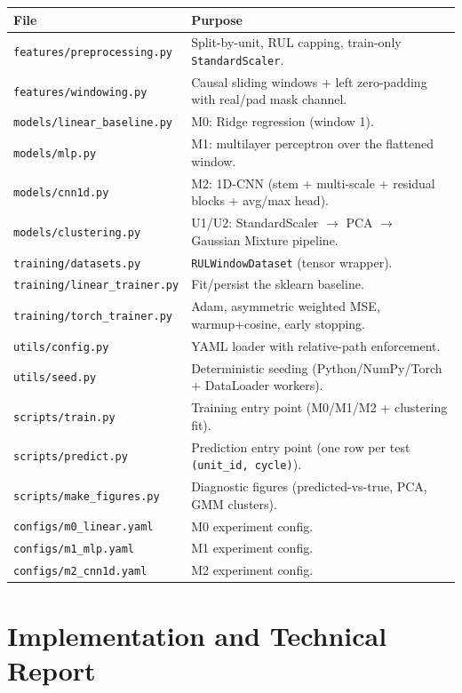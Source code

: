 \documentclass[11pt,a4paper]{article}
\newcommand{\code}[1]{\texttt{\small #1}}
\begin{document}
\begin{longtable}{p{6.5cm} p{8.5cm}}
\toprule
File & Purpose\\
\midrule
\endhead
\code{features/preprocessing.py} & Split-by-unit, RUL capping, train-only \code{StandardScaler}.\\
\code{features/windowing.py} & Causal sliding windows + left zero-padding with real/pad mask channel.\\
\code{models/linear\_baseline.py} & M0: Ridge regression (window 1).\\
\code{models/mlp.py} & M1: multilayer perceptron over the flattened window.\\
\code{models/cnn1d.py} & M2: 1D-CNN (stem + multi-scale + residual blocks + avg/max head).\\
\code{models/clustering.py} & U1/U2: StandardScaler $\to$ PCA $\to$ Gaussian Mixture pipeline.\\
\code{training/datasets.py} & \code{RULWindowDataset} (tensor wrapper).\\
\code{training/linear\_trainer.py} & Fit/persist the sklearn baseline.\\
\code{training/torch\_trainer.py} & Adam, asymmetric weighted MSE, warmup+cosine, early stopping.\\
\code{utils/config.py} & YAML loader with relative-path enforcement.\\
\code{utils/seed.py} & Deterministic seeding (Python/NumPy/Torch + DataLoader workers).\\
\code{scripts/train.py} & Training entry point (M0/M1/M2 + clustering fit).\\
\code{scripts/predict.py} & Prediction entry point (one row per test \code{(unit\_id, cycle)}).\\
\code{scripts/make\_figures.py} & Diagnostic figures (predicted-vs-true, PCA, GMM clusters).\\
\code{configs/m0\_linear.yaml} & M0 experiment config.\\
\code{configs/m1\_mlp.yaml} & M1 experiment config.\\
\code{configs/m2\_cnn1d.yaml} & M2 experiment config.\\
\bottomrule
\end{longtable}

\section{Implementation and Technical Report}
\end{document}
